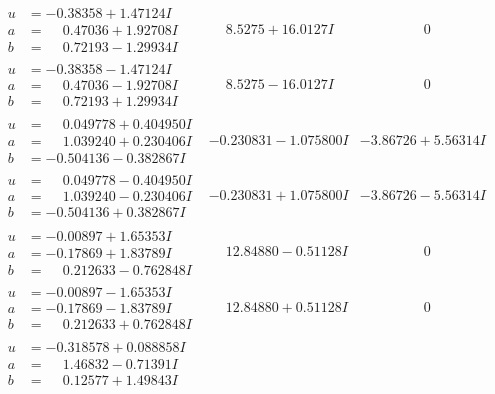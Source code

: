\documentclass[1p]{elsarticle_modified}
\theoremstyle{definition}
\begin{document}
$$\begin{array}{c|c|c}
\begin{aligned}
u &= -0.38358 + 1.47124 I \\
a &= \phantom{-}0.47036 + 1.92708 I \\
b &= \phantom{-}0.72193 - 1.29934 I\end{aligned}
 & \phantom{-}8.5275 + 16.0127 I & \phantom{-0.000000 } 0 \\ \hline\begin{aligned}
u &= -0.38358 - 1.47124 I \\
a &= \phantom{-}0.47036 - 1.92708 I \\
b &= \phantom{-}0.72193 + 1.29934 I\end{aligned}
 & \phantom{-}8.5275 - 16.0127 I & \phantom{-0.000000 } 0 \\ \hline\begin{aligned}
u &= \phantom{-}0.049778 + 0.404950 I \\
a &= \phantom{-}1.039240 + 0.230406 I \\
b &= -0.504136 - 0.382867 I\end{aligned}
 & -0.230831 - 1.075800 I & -3.86726 + 5.56314 I \\ \hline\begin{aligned}
u &= \phantom{-}0.049778 - 0.404950 I \\
a &= \phantom{-}1.039240 - 0.230406 I \\
b &= -0.504136 + 0.382867 I\end{aligned}
 & -0.230831 + 1.075800 I & -3.86726 - 5.56314 I \\ \hline\begin{aligned}
u &= -0.00897 + 1.65353 I \\
a &= -0.17869 + 1.83789 I \\
b &= \phantom{-}0.212633 - 0.762848 I\end{aligned}
 & \phantom{-}12.84880 - 0.51128 I & \phantom{-0.000000 } 0 \\ \hline\begin{aligned}
u &= -0.00897 - 1.65353 I \\
a &= -0.17869 - 1.83789 I \\
b &= \phantom{-}0.212633 + 0.762848 I\end{aligned}
 & \phantom{-}12.84880 + 0.51128 I & \phantom{-0.000000 } 0 \\ \hline\begin{aligned}
u &= -0.318578 + 0.088858 I \\
a &= \phantom{-}1.46832 - 0.71391 I \\
b &= \phantom{-}0.12577 + 1.49843 I\end{aligned}

\end{array}$$
\end{document}
